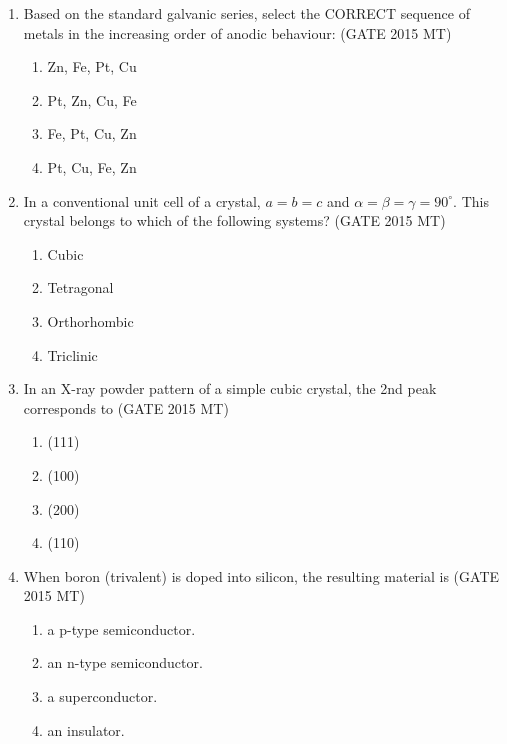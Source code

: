 \documentclass[12pt]{article}
\begin{document}
\begin{enumerate}
\item Based on the standard galvanic series, select the CORRECT sequence of metals in the increasing order of anodic behaviour: (GATE 2015 MT)

\vspace{0.5em}
\begin{enumerate}[label=(\alph*)]
    \item Zn, Fe, Pt, Cu
    \item Pt, Zn, Cu, Fe
    \item Fe, Pt, Cu, Zn
    \item Pt, Cu, Fe, Zn
\end{enumerate}
\vspace{0.5em}

\item In a conventional unit cell of a crystal, $a = b = c$ and $\alpha = \beta = \gamma = 90^\circ$. This crystal belongs to which of the following systems? (GATE 2015 MT)

\vspace{0.5em}
\begin{enumerate}[label=(\alph*)]
    \item Cubic
    \item Tetragonal
    \item Orthorhombic
    \item Triclinic
\end{enumerate}
\vspace{0.5em}

\item In an X-ray powder pattern of a simple cubic crystal, the 2nd peak corresponds to (GATE 2015 MT)

\vspace{0.5em}
\begin{enumerate}[label=(\alph*)]
    \item (111)
    \item (100)
    \item (200)
    \item (110)
\end{enumerate}
\vspace{0.5em}

\item  When boron (trivalent) is doped into silicon, the resulting material is (GATE 2015 MT)
\begin{enumerate}[label=(\alph*)]
  \item a p-type semiconductor.
  \item an n-type semiconductor.
  \item a superconductor.
  \item an insulator.
\end{enumerate}


\end{enumerate}
\end{document}
